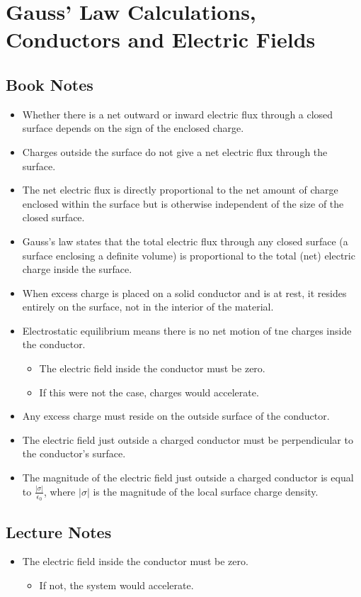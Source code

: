 \documentclass[11pt]{article}
\newcommand{\chapterTitle}{Gauss’ Law Calculations, Conductors and Electric Fields}
\begin{document}
\section{\chapterTitle}

\subsection{Book Notes}
\begin{itemize}
    \item Whether there is a net outward or inward electric flux through a closed surface depends on the sign of the enclosed charge.
    \item Charges outside the surface do not give a net electric flux through the surface.
    \item The net electric flux is directly proportional to the net amount of charge enclosed within the surface but is otherwise independent of the size of the closed surface.
    \item Gauss’s law states that the total electric flux through any closed surface (a surface enclosing a definite volume) is proportional to the total (net) electric charge inside the surface.
    \item When excess charge is placed on a solid conductor and is at rest, it resides entirely on the surface, not in the interior of the material.
    \item Electrostatic equilibrium means there is no net motion of tne charges inside the conductor.
    \begin{itemize}
        \item The electric field inside the conductor must be zero.
        \item If this were not the case, charges would accelerate.
    \end{itemize}

    \item Any excess charge must reside on the outside surface of the conductor.
    \item The electric field just outside a charged conductor must be perpendicular to the conductor’s surface.
    \item The magnitude of the electric field just outside a charged conductor is equal to $\frac{|\sigma|}{\epsilon_0}$, where $|\sigma|$ is the magnitude of the local surface charge density.
\end{itemize}

\subsection{Lecture Notes}
\begin{itemize}
    \item The electric field inside the conductor must be zero.
    \begin{itemize}
        \item If not, the system would accelerate.
    \end{itemize}
\end{itemize}
\end{document}
